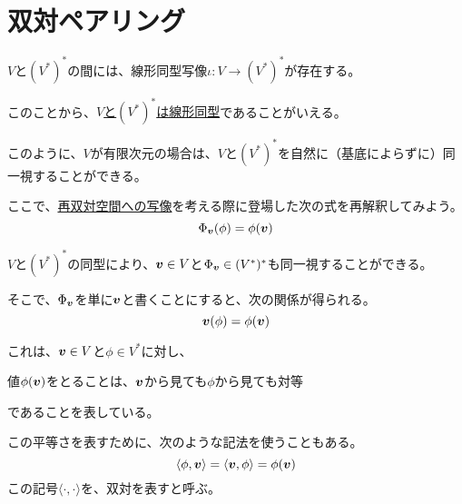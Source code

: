 \documentclass[../../../topic_linear-algebra]{subfiles}
\begin{document}
\sectionline
\section{双対ペアリング}

$V$と$(V^*)^*$の間には、線形同型写像$\iota \colon V \to (V^*)^*$が存在する。

このことから、\hyperref[def:linear-subspace-isomorphism]{$V$と$(V^*)^*$は線形同型}であることがいえる。

\br

このように、$V$が有限次元の場合は、$V$と$(V^*)^*$を自然に（基底によらずに）同一視することができる。

\br

ここで、\hyperref[sec:map-to-bidual]{再双対空間への写像}を考える際に登場した次の式を再解釈してみよう。
\begin{equation*}
  \Phi_{\vb*{v}}(\phi) = \phi(\vb*{v})
\end{equation*}

$V$と$(V^*)^*$の同型により、$\vb*{v} \in V$と$\Phi_{\vb*{v}} \in (V^*)^*$も同一視することができる。

そこで、$\Phi_{\vb*{v}}$を単に$\vb*{v}$と書くことにすると、次の関係が得られる。
\begin{equation*}
  \vb*{v}(\phi) = \phi(\vb*{v})
\end{equation*}

これは、$\vb*{v} \in V$と$\phi \in V^*$に対し、
\begin{emphabox}
  \begin{spacebox}
    \begin{center}
      値$\phi(\vb*{v})$をとることは、$\vb*{v}$から見ても$\phi$から見ても対等
    \end{center}
  \end{spacebox}
\end{emphabox}
であることを表している。

\br

この平等さを表すために、次のような記法を使うこともある。
\begin{equation*}
  \langle \phi, \vb*{v} \rangle = \langle \vb*{v}, \phi \rangle = \phi(\vb*{v})
\end{equation*}
この記号$\langle \cdot, \cdot \rangle$を、双対を表すと呼ぶ。
\end{document}
